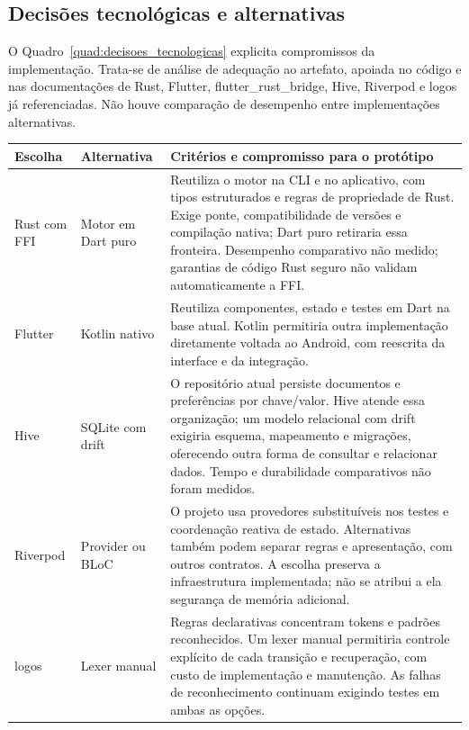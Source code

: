 \subsection{Decisões tecnológicas e alternativas}
\label{sec:decisoes_tecnologicas}

O Quadro~\ref{quad:decisoes_tecnologicas} explicita compromissos da implementação.
Trata-se de análise de adequação ao artefato, apoiada no código e nas documentações
de Rust, Flutter, flutter\_rust\_bridge, Hive, Riverpod e logos já referenciadas.
Não houve comparação de desempenho entre implementações alternativas.

\begin{quadro}[htb]
\centering
{}
\footnotesize
\begin{tabular}{|P{2.5cm}|P{3.0cm}|P{7.4cm}|}
\hline
Escolha & Alternativa & Critérios e compromisso para o protótipo \\
\hline\hline
Rust com FFI & Motor em Dart puro & Reutiliza o motor na CLI e no aplicativo, com tipos estruturados e regras de propriedade de Rust. Exige ponte, compatibilidade de versões e compilação nativa; Dart puro retiraria essa fronteira. Desempenho comparativo não medido; garantias de código Rust seguro não validam automaticamente a FFI. \\
\hline
Flutter & Kotlin nativo & Reutiliza componentes, estado e testes em Dart na base atual. Kotlin permitiria outra implementação diretamente voltada ao Android, com reescrita da interface e da integração.  \\
\hline
Hive & SQLite com drift & O repositório atual persiste documentos e preferências por chave/valor. Hive atende essa organização; um modelo relacional com drift exigiria esquema, mapeamento e migrações, oferecendo outra forma de consultar e relacionar dados. Tempo e durabilidade comparativos não foram medidos. \\
\hline
Riverpod & Provider ou BLoC & O projeto usa provedores substituíveis nos testes e coordenação reativa de estado. Alternativas também podem separar regras e apresentação, com outros contratos. A escolha preserva a infraestrutura implementada; não se atribui a ela segurança de memória adicional. \\
\hline
logos & Lexer manual & Regras declarativas concentram tokens e padrões reconhecidos. Um lexer manual permitiria controle explícito de cada transição e recuperação, com custo de implementação e manutenção. As falhas de reconhecimento continuam exigindo testes em ambas as opções. \\
\hline
\end{tabular}
\vspace{0.2cm}
\end{quadro}
\FloatBarrier


